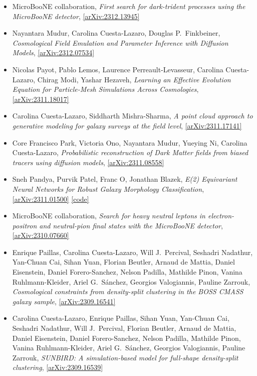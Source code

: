 \begin{itemize}
\item MicroBooNE collaboration, \textit{First search for dark-trident processes using the MicroBooNE detector}, \href{https://arxiv.org/abs/2312.13945}{[arXiv:2312.13945]} 
\item Nayantara Mudur, Carolina Cuesta-Lazaro, Douglas P.\  Finkbeiner, \textit{Cosmological Field Emulation and Parameter Inference with Diffusion Models}, \href{https://arxiv.org/abs/2312.07534}{[arXiv:2312.07534]} 
\item Nicolas Payot, Pablo Lemos, Laurence Perreault-Levasseur, Carolina Cuesta-Lazaro, Chirag Modi, Yashar Hezaveh, \textit{Learning an Effective Evolution Equation for Particle-Mesh Simulations Across Cosmologies}, \href{https://arxiv.org/abs/2311.18017}{[arXiv:2311.18017]} 
\item Carolina Cuesta-Lazaro, Siddharth Mishra-Sharma, \textit{A point cloud approach to generative modeling for galaxy surveys at the field level}, \href{https://arxiv.org/abs/2311.17141}{[arXiv:2311.17141]} 
\item Core Francisco Park, Victoria Ono, Nayantara Mudur, Yueying Ni, Carolina Cuesta-Lazaro, \textit{Probabilistic reconstruction of Dark Matter fields from biased tracers using diffusion models}, \href{https://arxiv.org/abs/2311.08558}{[arXiv:2311.08558]} 
\item Sneh Pandya, Purvik Patel, Franc O, Jonathan Blazek, \textit{E(2) Equivariant Neural Networks for Robust Galaxy Morphology Classification}, \href{https://arxiv.org/abs/2311.01500}{[arXiv:2311.01500]}  \href{https://github.com/snehjp2/GCNNMorphology}{[code]} 
\item MicroBooNE collaboration, \textit{Search for heavy neutral leptons in electron-positron and neutral-pion final states with the MicroBooNE detector}, \href{https://arxiv.org/abs/2310.07660}{[arXiv:2310.07660]} 
\item Enrique Paillas, Carolina Cuesta-Lazaro, Will J.\  Percival, Seshadri Nadathur, Yan-Chuan Cai, Sihan Yuan, Florian Beutler, Arnaud de Mattia, Daniel Eisenstein, Daniel Forero-Sanchez, Nelson Padilla, Mathilde Pinon, Vanina Ruhlmann-Kleider, Ariel G.\  Sánchez, Georgios Valogiannis, Pauline Zarrouk, \textit{Cosmological constraints from density-split clustering in the BOSS CMASS galaxy sample}, \href{https://arxiv.org/abs/2309.16541}{[arXiv:2309.16541]} 
\item Carolina Cuesta-Lazaro, Enrique Paillas, Sihan Yuan, Yan-Chuan Cai, Seshadri Nadathur, Will J.\  Percival, Florian Beutler, Arnaud de Mattia, Daniel Eisenstein, Daniel Forero-Sanchez, Nelson Padilla, Mathilde Pinon, Vanina Ruhlmann-Kleider, Ariel G.\  Sánchez, Georgios Valogiannis, Pauline Zarrouk, \textit{SUNBIRD: A simulation-based model for full-shape density-split clustering}, \href{https://arxiv.org/abs/2309.16539}{[arXiv:2309.16539]} 

\end{itemize}
